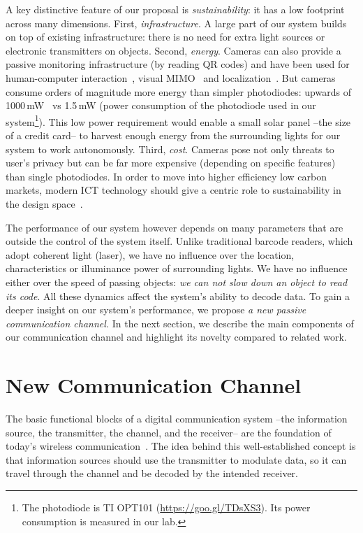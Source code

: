 \documentclass[10pt]{sig-alternate-05-2015}
\begin{document}
A key distinctive feature of our proposal is \emph{sustainability}: it has a low footprint across many dimensions. First, \emph{infrastructure}. A large part of our system builds on top of existing infrastructure: there is no need for extra light sources or electronic transmitters on objects. Second, \emph{energy}. Cameras can also provide a passive monitoring infrastructure (by reading QR codes) {and have been used for human-computer interaction}~\cite{Wachs:2011}, visual MIMO~\cite{Ashok:2010} and localization~\cite{Kuo2014}. But cameras consume orders of magnitude more energy than simpler photodiodes: upwards of 1000\,mW~\cite{Chen2013cameraenergy} vs 1.5\,mW (power consumption of the photodiode used in our system{{\footnote{{The photodiode is TI OPT101 (\url{https://goo.gl/TDsXS3}). Its power consumption is measured in our lab.}}}}).
This low power requirement would enable a small solar panel --the size of a credit card-- to harvest enough energy from the surrounding lights for our system to work autonomously. Third, \emph{cost}. {Cameras pose not only threats to user's privacy but} can be far more expensive (depending on specific features) than single photodiodes. {In order to move into higher efficiency low carbon markets, modern ICT technology should give a centric role to sustainability in the design space}~\cite{SMART2020}.

The performance of our system however depends on many parameters that are outside the control of the system itself. Unlike traditional barcode readers, which adopt coherent light (laser), we have no influence over the location, characteristics or illuminance power of surrounding lights. We have no influence either over the speed of passing objects: \textit{we can not slow down an object to read its code}. All these dynamics affect the system's ability to decode data. To gain a deeper insight on our system's performance, {we propose} \emph{a new passive communication channel.} In the next section, we describe the main components of our communication channel and highlight its novelty compared to related work.


\section{New Communication Channel}

The basic functional blocks of a digital communication system --the information source, the transmitter, the channel, and the receiver-- are the foundation of today's wireless communication~\cite{proakis2007}. The idea behind this well-established concept is that information sources should use the transmitter to modulate data, so it can travel through the channel and be decoded by the intended receiver.
\end{document}
